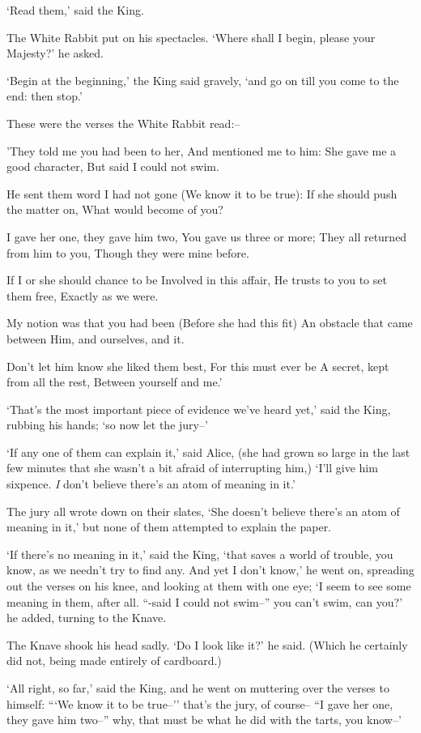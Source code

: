 \documentclass[statementpaper,twoside,openany]{memoir}
\begin{document}
`Read them,' said the King.

The White Rabbit put on his spectacles. `Where shall I begin, please your Majesty?' he asked.

`Begin at the beginning,' the King said gravely, `and go on till you come to the end: then stop.'

These were the verses the White Rabbit read:--

'They told me you had been to her, And mentioned me to him: She gave me a good character, But said I could not swim.

He sent them word I had not gone (We know it to be true): If she should push the matter on, What would become of you?

I gave her one, they gave him two, You gave us three or more; They all returned from him to you, Though they were mine before.

If I or she should chance to be Involved in this affair, He trusts to you to set them free, Exactly as we were.

My notion was that you had been (Before she had this fit) An obstacle that came between Him, and ourselves, and it.

Don't let him know she liked them best, For this must ever be A secret, kept from all the rest, Between yourself and me.'

`That's the most important piece of evidence we've heard yet,' said the King, rubbing his hands; `so now let the jury--'

`If any one of them can explain it,' said Alice, (she had grown so large in the last few minutes that she wasn't a bit afraid of interrupting him,) `I'll give him sixpence. \emph{I} don't believe there's an atom of meaning in it.'

The jury all wrote down on their slates, `She doesn't believe there's an atom of meaning in it,' but none of them attempted to explain the paper.

`If there's no meaning in it,' said the King, `that saves a world of trouble, you know, as we needn't try to find any. And yet I don't know,' he went on, spreading out the verses on his knee, and looking at them with one eye; `I seem to see some meaning in them, after all. ``-said I could not swim--'' you can't swim, can you?' he added, turning to the Knave.

The Knave shook his head sadly. `Do I look like it?' he said. (Which he certainly did not, being made entirely of cardboard.)

`All right, so far,' said the King, and he went on muttering over the verses to himself: ```We know it to be true--'' that's the jury, of course-- ``I gave her one, they gave him two--'' why, that must be what he did with the tarts, you know--'
\end{document}
